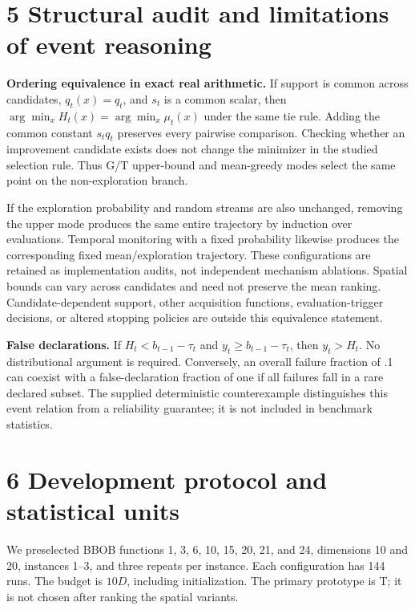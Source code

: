 \documentclass[11pt,a4paper]{article}
\begin{document}
\hypertarget{structural-audit-and-limitations-of-event-reasoning}{%
\section{5 Structural audit and limitations of event
reasoning}\label{structural-audit-and-limitations-of-event-reasoning}}

\textbf{Ordering equivalence in exact real arithmetic.} If support is
common across candidates, \(q_t(x)=q_t\), and \(s_t\) is a common
scalar, then \(\arg\min_xH_t(x)=\arg\min_x\mu_t(x)\) under the same tie
rule. Adding the common constant \(s_tq_t\) preserves every pairwise
comparison. Checking whether an improvement candidate exists does not
change the minimizer in the studied selection rule. Thus G/T upper-bound
and mean-greedy modes select the same point on the non-exploration
branch.

If the exploration probability and random streams are also unchanged,
removing the upper mode produces the same entire trajectory by induction
over evaluations. Temporal monitoring with a fixed probability likewise
produces the corresponding fixed mean/exploration trajectory. These
configurations are retained as implementation audits, not independent
mechanism ablations. Spatial bounds can vary across candidates and need
not preserve the mean ranking. Candidate-dependent support, other
acquisition functions, evaluation-trigger decisions, or altered stopping
policies are outside this equivalence statement.

\textbf{False declarations.} If \(H_t<b_{t-1}-\tau_t\) and
\(y_t\ge b_{t-1}-\tau_t\), then \(y_t>H_t\). No distributional argument
is required. Conversely, an overall failure fraction of .1 can coexist
with a false-declaration fraction of one if all failures fall in a rare
declared subset. The supplied deterministic counterexample distinguishes
this event relation from a reliability guarantee; it is not included in
benchmark statistics.

\hypertarget{development-protocol-and-statistical-units}{%
\section{6 Development protocol and statistical
units}\label{development-protocol-and-statistical-units}}

We preselected BBOB functions 1, 3, 6, 10, 15, 20, 21, and 24,
dimensions 10 and 20, instances 1--3, and three repeats per instance.
Each configuration has 144 runs. The budget is \(10D\), including
initialization. The primary prototype is T; it is not chosen after
ranking the spatial variants.
\end{document}
